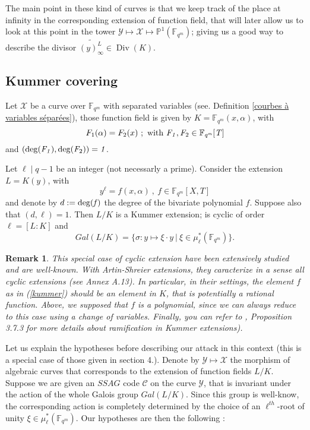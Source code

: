 \documentclass[10pt]{article}
\newtheorem{rq1}[thm]{Remark}
\newcommand{\s}{\vspace{0.3cm}}
\newcommand{\cd}{\cdot}
\newcommand{\PP}{\mathbb{P}}
\newcommand{\fqm}{\mathbb{F}_{q^m}}
\newcommand{\X}{\mathcal{X}}
\newcommand{\Y}{\mathcal{Y}}
\newcommand{\Div}{\operatorname{Div}}
\begin{document}
\s

The main point in these kind of curves is that we keep track of the place at infinity in the corresponding extension of function field, that will later allow us to look at this point in the tower $\Y \longmapsto \X \longmapsto \PP^1(\fqm)$; giving us a good way to describe the divisor $\widetilde{(y)_{\infty}^L} \in \Div(K)$.


\s

\subsection{Kummer covering}

\s

Let $\X$ be a curve over $\fqm$ with separated variables (see. Definition \ref{courbes à variables séparées}), those function field is given by $K=\fqm(x,\alpha)$, with
\[F_1(\alpha) = F_2(x) \ ; \ \rm {with} \ \it F_1,F_{\rm 2} \in \fqm[T] \]
and $(\rm{deg}\it(F_1),\rm{deg}\it(F_{\rm{2}}))=1$. 

\s

Let $\ell \mid q-1$ be an integer (not necessarly a prime). Consider the extension $L=K(y)$, with
\begin{equation} \label{kummer}
y^{\ell} = f(x,\alpha) \ , \ f \in \fqm[X,T] 
\end{equation}
and denote by $d:=\rm{deg}\it(f)$ the degree of the bivariate polynomial $f$. Suppose also that $(d,\ell)=1$. Then $L/K$ is a Kummer extension; is cyclic of order $\ell=[L:K]$ and 
\[Gal(L/K) = \{ \sigma : y \mapsto \xi \cd y \ | \ \xi \in \mu^*_{\ell}(\fqm)\}.\] 

\s

\begin{rq1} \label{pk des polynômes}
This special case of cyclic extension have been extensively studied and are well-known. With Artin-Shreier extensions, they caracterize in a sense all cyclic extensions (see \cite{Sti} Annex A.13). In particular, in their settings, the element $f$ as in (\ref{kummer}) should be an element in $K$, that is potentially a rational function. Above, we supposed that $f$ is a polynomial, since we can always reduce to this case using a change of variables. Finally, you can refer to \cite{Sti}, Proposition 3.7.3 for more details about ramification in Kummer extensions).
\end{rq1}

\s

Let us explain the hypotheses before describing our attack in this context (this is a special case of those given in section 4.). Denote by $\Y \longmapsto \X$ the morphism of algebraic curves that corresponds to the extension of function fields $L/K$. Suppose we are given an $SSAG$ code $\mathcal{C}$ on the curve $\Y$, that is invariant under the action of the whole Galois group $Gal(L/K)$. Since this group is well-know, the corresponding action is completely determined by the choice of an $\ell^{th}$-root of unity $\xi \in \mu^*_{\ell}(\fqm)$. Our hypotheses are then the following :
\end{document}
